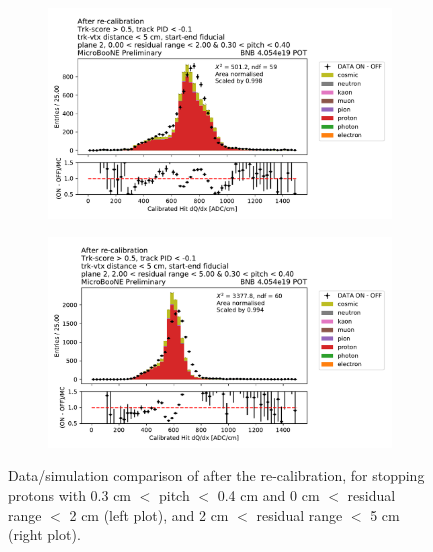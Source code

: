 \begin{figure}[H] 
\begin{center}
    \begin{subfigure}[b]{0.45\textwidth}
    \centering
    \includegraphics[width=1.00\textwidth]{stopping_muons_protons/protons_000_residualrange_200_030_pitch_040depois.pdf}
    \end{subfigure}
    \begin{subfigure}[b]{0.45\textwidth}
    \centering
    \includegraphics[width=1.00\textwidth]{stopping_muons_protons/protons_200_residualrange_500_030_pitch_040depois.pdf}
    \end{subfigure}
\caption{Data/simulation comparison of  \dqdx after the re-calibration, for stopping protons with 0.3 cm $<$ pitch $<$ 0.4 cm and 0 cm $<$ residual range $<$ 2 cm (left plot), and 2 cm $<$ residual range $<$ 5 cm (right plot).}
\label{fig:stopping_muons_recombination}
\end{center}
\end{figure}


